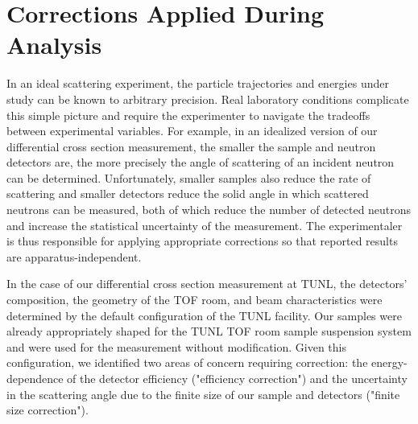 \section{Corrections Applied During Analysis}

In an ideal scattering experiment, the particle trajectories
and energies under study can be known to arbitrary precision. Real laboratory
conditions complicate this simple picture and require the experimenter to
navigate the tradeoffs between experimental variables. For example, in an
idealized version of our differential cross
section measurement, the smaller the sample and neutron detectors are, the more precisely
the angle of scattering of an incident neutron can be determined. Unfortunately,
smaller samples also reduce the rate of scattering and smaller detectors
reduce the solid angle in which scattered neutrons can be measured, both of
which reduce the number of detected neutrons and increase the statistical
uncertainty of the measurement. The experimentaler is thus responsible for applying
appropriate corrections so that reported results are apparatus-independent.

In the case of our differential cross section measurement at TUNL, the detectors'
composition, the geometry of the TOF room, and beam characteristics were
determined by the default configuration of the TUNL facility. Our samples were already
appropriately shaped for the TUNL TOF room sample suspension system and were
used for the measurement without modification. Given this configuration, we
identified two areas of concern requiring correction: the energy-dependence of
the detector efficiency ("efficiency correction") and the uncertainty in the
scattering angle due to the finite size of our sample and detectors ("finite
size correction").

